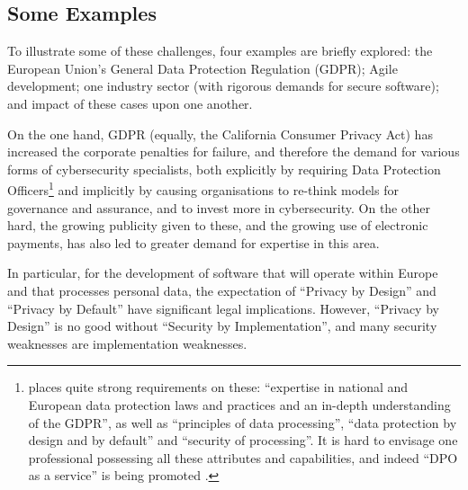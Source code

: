 \documentclass[conference]{IEEEtran}
\begin{document}


\subsection{Some Examples}

To illustrate some of these challenges, four examples are briefly explored: the European Union's General Data Protection Regulation (GDPR); Agile development; one industry sector (with rigorous demands for secure software); and impact of these cases upon one another.

On the one hand, GDPR (equally, the  California Consumer Privacy Act) has increased the corporate penalties for failure, and therefore the demand for various forms of cybersecurity specialists, both explicitly by requiring Data Protection Officers\footnote{\cite{EU292016a} places quite strong requirements on these: ``expertise in national and European data protection laws and practices and an in-depth understanding of the GDPR'', as well as ``principles of data processing'', ``data protection by design and by default'' and ``security of processing''. It is hard to envisage one professional possessing all these attributes and capabilities, and indeed ``DPO as a service'' is being promoted \cite{McCreanor2018d}.} and implicitly by causing organisations to re-think models for governance and assurance, and to invest more in cybersecurity. On the other hard, the growing publicity given to these, and the growing use of electronic payments, has also led to greater demand for expertise in this area.

In particular, for the development of software that will operate within Europe and that processes personal data, the expectation of ``Privacy by Design'' and ``Privacy by Default'' have significant legal implications. However, ``Privacy by Design'' is no good without ``Security by Implementation'', and many security weaknesses are implementation weaknesses.
\end{document}
